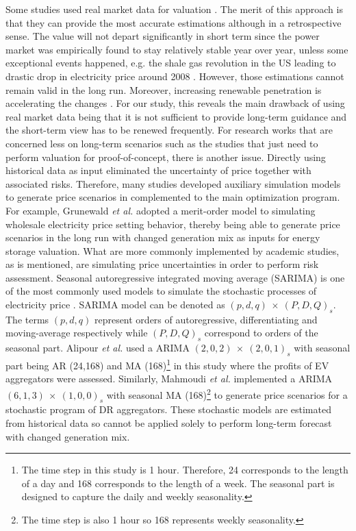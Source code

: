 Some studies used real market data for valuation \cite{Walawalkar2007,Sioshansi2009,Byrne2012,Bradbury2014,McConnell2015,Berrada2016,Salles2017}. The merit of this approach is that they can provide the most accurate estimations although in a retrospective sense. The value will not depart significantly in short term since the power market was empirically found to stay relatively stable year over year, unless some exceptional events happened, e.g. the shale gas revolution in the US leading to drastic drop in electricity price around 2008 \cite{Brown2015,Salles2017}. However, those estimations cannot remain valid in the long run. Moreover, increasing renewable penetration is accelerating the changes \cite{Woo2011,Gelabert2011,Mulder2013,Forrest2013,Wurzburg2013,Clo2015,Cludius2014}. 
For our study, this reveals the main drawback of using real market data being that it is not sufficient to provide long-term guidance and the short-term view has to be renewed frequently. For research works that are concerned less on long-term scenarios such as the studies that just need to perform valuation for proof-of-concept, there is another issue. Directly using historical data as input eliminated the uncertainty of price together with associated risks.
Therefore, many studies developed auxiliary simulation models to generate price scenarios in complemented to the main optimization program. For example, Grunewald \textit{et al.} \cite{Grunewald2012a} adopted a merit-order model to simulating wholesale electricity price setting behavior, thereby being able to generate price scenarios in the long run with changed generation mix as inputs for energy storage valuation. What are more commonly implemented by academic studies, as is mentioned, are simulating price uncertainties  in order to perform risk assessment. Seasonal autoregressive integrated moving average (SARIMA) is one of the most commonly used models to simulate the stochastic processes of electricity price \cite{Weron2014,Ziel2015,Mahmoudi2017,Alipour2017}. SARIMA model can be denoted as $(p,d,q)~\times~(P,D,Q)_s$. The terms $(p,d,q)$ represent orders of autoregressive, differentiating and moving-average respectively while $(P,D,Q)_s$ correspond to orders of the seasonal part.
Alipour \textit{et al.} used a ARIMA $(2,0,2)~\times~(2,0,1)_s$ with seasonal part being AR (24,168) and MA (168)\footnote{The time step in this study is 1 hour. Therefore, 24 corresponds to the length of a day and 168 corresponds to the length of a week. The seasonal part is designed to capture the daily and weekly seasonality.} in this study where the profits of EV aggregators were assessed. Similarly, Mahmoudi \textit{et al.}\cite{Mahmoudi2017} implemented a ARIMA $(6,1,3)~\times~(1,0,0)_s$ with seasonal MA (168)\footnote{The time step is also 1 hour so 168 represents weekly seasonality.} to generate price scenarios for a stochastic program of DR aggregators. These stochastic models are estimated from historical data so cannot be applied solely to perform long-term forecast with changed generation mix.

